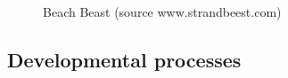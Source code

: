 \documentclass[
  a4paper,
  DIV=11,
  numbers=noendperiod,
  oneside]{scrreprt}
\begin{document}
\begin{figure}


\caption{\label{fig-ch5n-img8-old-46}Beach Beast (source
www.strandbeest.com)}

\end{figure}%

\subsection{Developmental processes}\label{sec-Developmental-processes}
\end{document}
